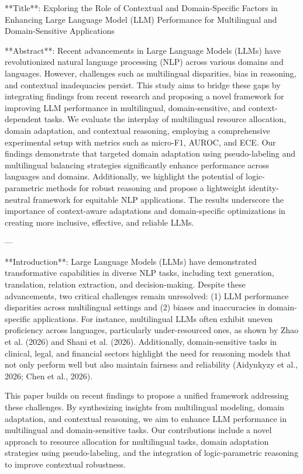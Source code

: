 **Title**: Exploring the Role of Contextual and Domain-Specific Factors in Enhancing Large Language Model (LLM) Performance for Multilingual and Domain-Sensitive Applications  

**Abstract**:  
Recent advancements in Large Language Models (LLMs) have revolutionized natural language processing (NLP) across various domains and languages. However, challenges such as multilingual disparities, bias in reasoning, and contextual inadequacies persist. This study aims to bridge these gaps by integrating findings from recent research and proposing a novel framework for improving LLM performance in multilingual, domain-sensitive, and context-dependent tasks. We evaluate the interplay of multilingual resource allocation, domain adaptation, and contextual reasoning, employing a comprehensive experimental setup with metrics such as micro-F1, AUROC, and ECE. Our findings demonstrate that targeted domain adaptation using pseudo-labeling and multilingual balancing strategies significantly enhance performance across languages and domains. Additionally, we highlight the potential of logic-parametric methods for robust reasoning and propose a lightweight identity-neutral framework for equitable NLP applications. The results underscore the importance of context-aware adaptations and domain-specific optimizations in creating more inclusive, effective, and reliable LLMs.

---

**Introduction**:  
Large Language Models (LLMs) have demonstrated transformative capabilities in diverse NLP tasks, including text generation, translation, relation extraction, and decision-making. Despite these advancements, two critical challenges remain unresolved: (1) LLM performance disparities across multilingual settings and (2) biases and inaccuracies in domain-specific applications. For instance, multilingual LLMs often exhibit uneven proficiency across languages, particularly under-resourced ones, as shown by Zhao et al. (2026) and Shani et al. (2026). Additionally, domain-sensitive tasks in clinical, legal, and financial sectors highlight the need for reasoning models that not only perform well but also maintain fairness and reliability (Aidynkyzy et al., 2026; Chen et al., 2026).

This paper builds on recent findings to propose a unified framework addressing these challenges. By synthesizing insights from multilingual modeling, domain adaptation, and contextual reasoning, we aim to enhance LLM performance in multilingual and domain-sensitive tasks. Our contributions include a novel approach to resource allocation for multilingual tasks, domain adaptation strategies using pseudo-labeling, and the integration of logic-parametric reasoning to improve contextual robustness.

